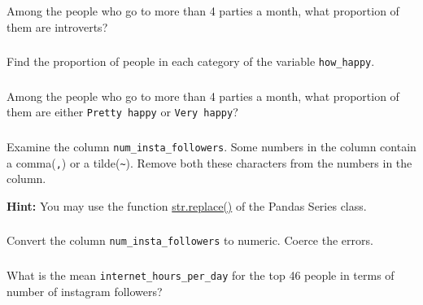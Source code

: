 \documentclass[
  letterpaper,
  DIV=11,
  numbers=noendperiod]{scrreprt}
\begin{document}
Among the people who go to more than 4 parties a month, what proportion
of them are introverts?

\hypertarget{section-32}{%
\subsubsection{}\label{section-32}}

Find the proportion of people in each category of the variable
\texttt{how\_happy}.

\hypertarget{section-33}{%
\subsubsection{}\label{section-33}}

Among the people who go to more than 4 parties a month, what proportion
of them are either \texttt{Pretty\ happy} or \texttt{Very\ happy}?

\hypertarget{section-34}{%
\subsubsection{}\label{section-34}}

Examine the column \texttt{num\_insta\_followers}. Some numbers in the
column contain a comma(\texttt{,}) or a
tilde(\texttt{\textasciitilde{}}). Remove both these characters from the
numbers in the column.

\textbf{Hint:} You may use the function
\href{https://pandas.pydata.org/docs/reference/api/pandas.Series.str.replace.html}{str.replace()}
of the Pandas Series class.

\hypertarget{section-35}{%
\subsubsection{}\label{section-35}}

Convert the column \texttt{num\_insta\_followers} to numeric. Coerce the
errors.

\hypertarget{section-36}{%
\subsubsection{}\label{section-36}}

What is the mean \texttt{internet\_hours\_per\_day} for the top 46
people in terms of number of instagram followers?

\hypertarget{section-37}{%
\subsubsection{}\label{section-37}}
\end{document}
